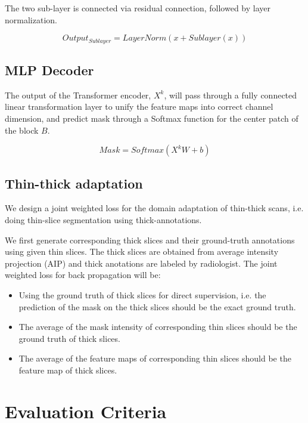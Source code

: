 \documentclass{article}
\begin{document}
The two sub-layer is connected via residual connection, followed by layer normalization. 

\begin{equation}
  Output_{Sublayer} = LayerNorm(x + Sublayer(x))
  \label{eq:9}
\end{equation}

\subsection{MLP Decoder}

The output of the Transformer encoder, $X^k$, will pass through a fully connected linear transformation layer to unify the feature maps into correct channel dimension, and predict mask through a Softmax function for the center patch of the block $B$.

\begin{equation}
  Mask = Softmax(X^kW + b)
  \label{eq:10}
\end{equation}

\subsection{Thin-thick adaptation}

We design a joint weighted loss for the domain adaptation of thin-thick scans, i.e. doing thin-slice segmentation using thick-annotations.

We first generate corresponding thick slices and their ground-truth annotations using given thin slices. The thick slices are obtained from average intensity projection (AIP) \cite{31} and thick anotations are labeled by radiologist. The joint weighted loss for back propagation will be:

\begin{itemize}
    \item Using the ground truth of thick slices for direct supervision, i.e. the prediction of the mask on the thick slices should be the exact ground truth.
    \item The average of the mask intensity of corresponding thin slices should be the ground truth of thick slices.
    \item The average of the feature maps of corresponding thin slices should be the feature map of thick slices.
\end{itemize}

\section{Evaluation Criteria}
\end{document}
